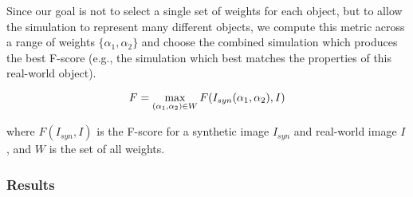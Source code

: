     
    Since our goal is not to select a single set of weights for each object, but to allow the simulation to represent many different objects, we compute this metric across a range of weights $\{ \alpha_1, \alpha_2\}$ and choose the combined simulation which produces the best F-score (e.g., the simulation which best matches the properties of this real-world object). 
    
    \vspace{-0.1pt}
    {
    \eqsize
    \begin{equation}
        F = \max_{(\alpha_1, \alpha_2) \in W} F(I_{syn}(\alpha_1, \alpha_2), I)
        \label{eq:metric}
    \vspace{-0.1pt}
    \end{equation}
    }

    \noindent where $F(I_{syn}, I)$ is the F-score for a synthetic image $I_{syn}$ and real-world image $I$, and $W$ is the set of all weights.
    

\vspace{-0.1pt}
\subsubsection{Results}
\vspace{-0.1pt}



